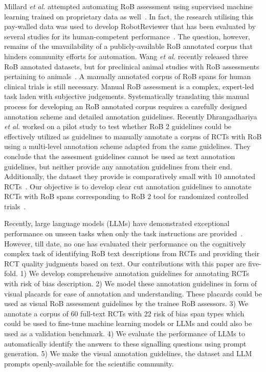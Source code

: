 \documentclass[sn-mathphys,Numbered]{sn-jnl}%
\theoremstyle{thmstyleone}%
\theoremstyle{thmstyletwo}%
\theoremstyle{thmstylethree}%
\begin{document}
Millard \textit{et al.} attempted automating RoB assessment using supervised machine learning trained on proprietary data as well~\cite{millard2016machine}.
In fact, the research utilising this pay-walled data was used to develop RobotReviewer that has been evaluated by several studies for its human-competent performance~\cite{marshall2016robotreviewer,soboczenski2019machine,vinkers2021methodological,jardim2022automating,hirt2021agreement}.
The question, however, remains of the unavailability of a publicly-available RoB annotated corpus that hinders community efforts for automation. 
Wang \textit{et al.} recently released three RoB annotated datasets, but for preclinical animal studies with RoB assessments pertaining to animals~\cite{wang2022risk}.
A manually annotated corpus of RoB spans for human clinical trials is still necessary.
Manual RoB assessment is a complex, expert-led task laden with subjective judgements.
Systematically translating this manual process for developing an RoB annotated corpus requires a carefully designed annotation scheme and detailed annotation guidelines.
Recently Dhrangadhariya \textit{et al.} worked on a pilot study to test whether RoB 2 guidelines could be effectively utilized as guidelines to manually annotate a corpus of RCTs with RoB using a multi-level annotation scheme adapted from the same guidelines.
They conclude that the assesment guidelines cannot be used as text annotation guidelines, but neither provide any annotation guidelines from their end.
Additionally, the dataset they provide is comparatively small with 10 annotated RCTs~\cite{dhrangadhariya2023first}.
Our objective is to develop clear cut annotation guidelines to annotate RCTs with RoB spans corresponding to RoB 2 tool for randomized controlled trials~\cite{sterne2019rob}.



Recently, large language models (LLMs) have demonstrated exceptional performance on unseen tasks when only the task instructions are provided~\cite{chang2023survey}.
However, till date, no one has evaluated their performance on the cognitively complex task of identifying RoB text descriptions from RCTs and providing their RCT quality judgments based on text.
Our contributions with this paper are five-fold. 
1) We develop comprehensive annotation guidelines for annotating RCTs with risk of bias description.
2) We model these annotation guidelines in form of visual placards for ease of annotation and understanding. These placards could be used as visual RoB assessment guidelines by the trainee RoB assessors.
3) We annotate a corpus of 60 full-text RCTs with 22 risk of bias span types which could be used to fine-tune machine learning models or LLMs and could also be used as a validation benchmark.
4) We evaluate the performance of LLMs to automatically identify the answers to these signalling questions using prompt generation.
5) We make the visual annotation guidelines, the dataset and LLM prompts openly-available for the scientific community.
%
%
%
\end{document}
